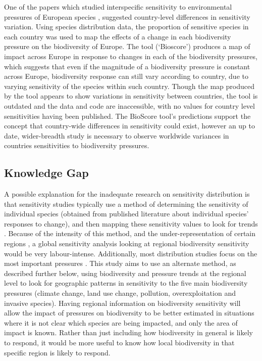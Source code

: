 \documentclass[11pt, a4paper, titlepage]{article}
\begin{document}
   	 One of the papers which studied interspecific sensitivity to environmental pressures of European species \citep{louette2010bioscore}, suggested country-level differences in sensitivity variation. Using species distribution data, the proportion of sensitive species in each country was used to map the effects of a change in each biodiversity pressure on the biodiversity of Europe. The tool (`Bioscore') produces a map of impact across Europe in response to changes in each of the biodiversity pressures, which suggests that even if the magnitude of a biodiversity pressure is constant across Europe, biodiversity response can still vary according to country, due to varying sensitivity of the species within such country. Though the map produced by the tool appears to show variations in sensitivity between countries, the tool is outdated and the data and code are inaccessible, with no values for country level sensitivities having been published. The BioScore tool's predictions support the concept that country-wide differences in sensitivity could exist, however an up to date, wider-breadth study is necessary to observe worldwide variances in countries sensitivities to biodiversity pressures. \newline
   	 

   	\subsection*{Knowledge Gap}
 	A possible explanation for the inadequate research on sensitivity distribution is that sensitivity studies typically use a method of determining the sensitivity of individual species (obtained from published literature about individual species' responses to change), and then mapping these sensitivity values to look for trends \citep{louette2010bioscore}. Because of the intensity of this method, and the under-representation of certain regions \citep{collen2008tropical}, a global sensitivity analysis looking at regional biodiversity sensitivity would be very labour-intense. Additionally, most distribution studies focus on the most important pressures \citep{ferrier2016summary}. This study aims to use an alternate method, as described further below, using biodiversity and pressure trends at the regional level to look for geographic patterns in sensitivity to the five main biodiversity pressures (climate change, land use change, pollution, overexploitation and invasive species). Having regional information on biodiversity sensitivity will allow the impact of pressures on biodiversity to be better estimated in situations where it is not clear which species are being impacted, and only the area of impact is known. Rather than just including how biodiversity in general is likely to respond, it would be more useful to know how local biodiversity in that specific region is likely to respond.  \newline
   	 
\end{document}
